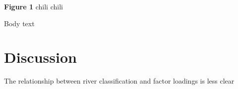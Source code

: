\documentclass{article}
\begin{document}
\begin{center}
\textbf{Figure 1} chili chili
\end{center}

Body text

\section*{Discussion}
The relationship between river classification and factor loadings is less clear
\end{document}
